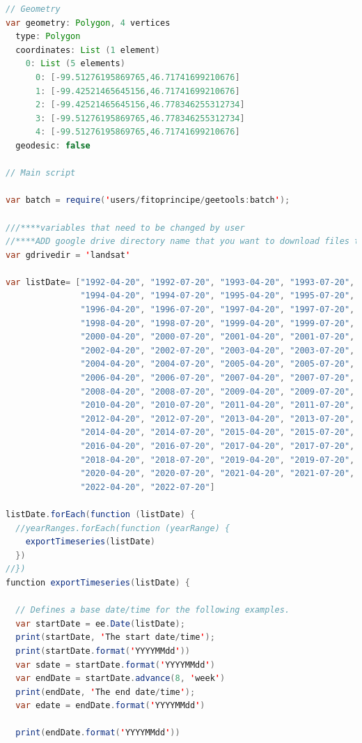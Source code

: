 \documentclass[
]{article}
\begin{document}
\begin{lstlisting}[language=Java]
// Geometry
var geometry: Polygon, 4 vertices
  type: Polygon
  coordinates: List (1 element)
    0: List (5 elements)
      0: [-99.51276195869765,46.71741699210676]
      1: [-99.42521465645156,46.71741699210676]
      2: [-99.42521465645156,46.778346255312734]
      3: [-99.51276195869765,46.778346255312734]
      4: [-99.51276195869765,46.71741699210676]
  geodesic: false

// Main script

var batch = require('users/fitoprincipe/geetools:batch');

///****variables that need to be changed by user
//****ADD google drive directory name that you want to download files to
var gdrivedir = 'landsat'

var listDate= ["1992-04-20", "1992-07-20", "1993-04-20", "1993-07-20", 
               "1994-04-20", "1994-07-20", "1995-04-20", "1995-07-20", 
               "1996-04-20", "1996-07-20", "1997-04-20", "1997-07-20", 
               "1998-04-20", "1998-07-20", "1999-04-20", "1999-07-20", 
               "2000-04-20", "2000-07-20", "2001-04-20", "2001-07-20", 
               "2002-04-20", "2002-07-20", "2003-04-20", "2003-07-20",
               "2004-04-20", "2004-07-20", "2005-04-20", "2005-07-20", 
               "2006-04-20", "2006-07-20", "2007-04-20", "2007-07-20", 
               "2008-04-20", "2008-07-20", "2009-04-20", "2009-07-20",
               "2010-04-20", "2010-07-20", "2011-04-20", "2011-07-20", 
               "2012-04-20", "2012-07-20", "2013-04-20", "2013-07-20", 
               "2014-04-20", "2014-07-20", "2015-04-20", "2015-07-20",
               "2016-04-20", "2016-07-20", "2017-04-20", "2017-07-20", 
               "2018-04-20", "2018-07-20", "2019-04-20", "2019-07-20", 
               "2020-04-20", "2020-07-20", "2021-04-20", "2021-07-20",
               "2022-04-20", "2022-07-20"]

listDate.forEach(function (listDate) {
  //yearRanges.forEach(function (yearRange) {
    exportTimeseries(listDate)
  })
//})
function exportTimeseries(listDate) {
  
  // Defines a base date/time for the following examples.
  var startDate = ee.Date(listDate);
  print(startDate, 'The start date/time');
  print(startDate.format('YYYYMMdd'))
  var sdate = startDate.format('YYYYMMdd')
  var endDate = startDate.advance(8, 'week')
  print(endDate, 'The end date/time');
  var edate = endDate.format('YYYYMMdd')
  
  print(endDate.format('YYYYMMdd'))


\end{lstlisting}
\end{document}
